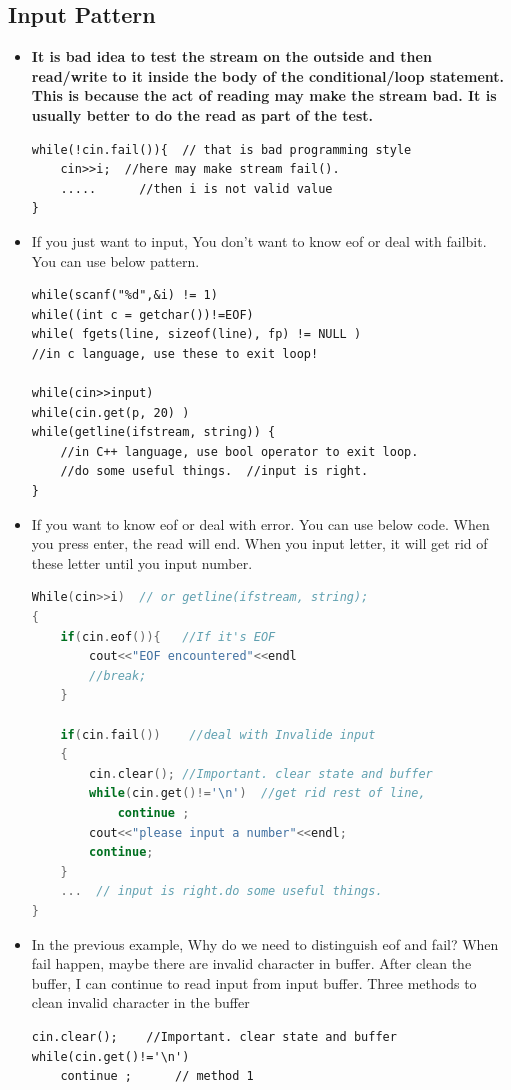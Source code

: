 \documentclass[a4paper,11pt,twoside]{book}
\begin{document}
\subsection{Input Pattern}

\begin{itemize}
	\item \textbf{It is bad idea to test the stream on the outside and then read/write to it inside the body of the conditional/loop statement. This is because the act of reading may make the stream bad. It is usually better to do the read as part of the test.}
	
\begin{lstlisting}[numbers=none]
while(!cin.fail()){  // that is bad programming style
	cin>>i;  //here may make stream fail().
	.....      //then i is not valid value
}
	\end{lstlisting}
	
	\item If you just want to input, You don't want to know eof or deal with failbit. You can use below pattern.
	
\begin{lstlisting}[numbers=none]
while(scanf("%d",&i) != 1)
while((int c = getchar())!=EOF)
while( fgets(line, sizeof(line), fp) != NULL )
//in c language, use these to exit loop!
	
while(cin>>input)
while(cin.get(p, 20) )
while(getline(ifstream, string)) {
	//in C++ language, use bool operator to exit loop.
	//do some useful things.  //input is right.
}
\end{lstlisting}
	
	\item If you want to know eof or deal with error. You can use below code. When you press enter, the read will end. When you input letter, it will get rid of these letter until you input number. 
\begin{lstlisting}[frame=single, language=c++]
While(cin>>i)  // or getline(ifstream, string);
{
	if(cin.eof()){   //If it's EOF
		cout<<"EOF encountered"<<endl
		//break;
	}
	
	if(cin.fail())    //deal with Invalide input
	{
		cin.clear(); //Important. clear state and buffer
		while(cin.get()!='\n')  //get rid rest of line,
			continue ;
		cout<<"please input a number"<<endl;
		continue;
	}
	...  // input is right.do some useful things.
}
\end{lstlisting}
	
	\item In the previous example, Why do we need to distinguish eof and fail? When fail happen, maybe there are invalid character in buffer. After clean the buffer, I can continue to read input from input buffer. Three methods to clean invalid character in the buffer
\begin{lstlisting}[numbers=none]
cin.clear();    //Important. clear state and buffer
while(cin.get()!='\n')
	continue ;      // method 1
	

\end{lstlisting}
\end{itemize}
\end{document}
